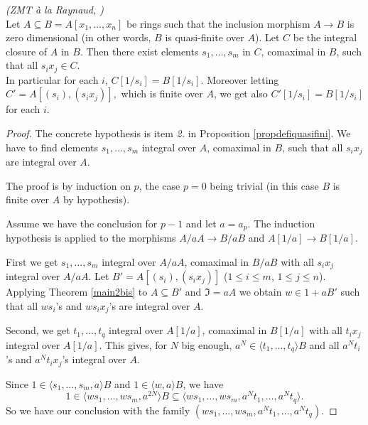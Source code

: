 \documentclass[11pt,a4paper,twoside]{article}
\newcommand{\gothic}{\mathfrak}
\newcommand{\fI}{{\gothic I}}
\newcommand\gen[1]{{\langle #1 \rangle}}
\begin{document}
\begin{theorem}\label{main3} \emph{(ZMT \`a la Raynaud, \cite{Ray})}\\
Let $A\subseteq B = A[x_1,\dots,x_n]$ be rings  
 such that the inclusion morphism $A\to B$ is zero dimensional
 (in other words, $B$ is quasi-finite over $A$).
Let $C$ be the integral closure of $A$ in $B$.
Then  there exist elements $s_1,\dots,s_m$ in $C$, comaximal in $B$, such that
all  $s_ix_j\in C$. \\
In particular for each $i$, $C[1/s_i]=B[1/s_i]$. 
Moreover  letting $C'=A[(s_i),(s_ix_j)],$ which is finite over $A$,
 we get also  $C'[1/s_i]=B[1/s_i]$ for each $i$.
 \end{theorem}
%
\begin{proof}
The concrete hypothesis is item \emph{2.} in Proposition \ref{propdefiquasifini}.
We have to find elements $s_1,\dots,s_m$ integral over $A$, comaximal in $B$,
such that all $s_ix_j$ are integral over $A$.

\noindent 
The proof is by induction on $p$, the case $p=0$ being trivial (in this case $B$
is finite over $A$ by hypothesis). 

\noindent 
Assume we have the conclusion for $p-1$ and let $a=a_p$. The induction hypothesis is applied to the morphisms $A/aA\to B/aB$ and $A[1/a]\to B[1/a]$.

\noindent 
First we get $s_1,\dots,s_m$ integral over $A/aA$, comaximal in $B/aB$
with all $s_ix_j$ integral over $A/aA$. 
Let $B'=A[(s_i),(s_ix_j)]$ ($1\leq i\leq m $, $1\leq j\leq n$).
Applying Theorem  \ref{main2bis} to $A\subseteq B'$ and $\fI=aA$ we obtain $w\in 1+aB'$ such that all $ws_i$'s and $ws_ix_j$'s are integral over $A$.

\noindent 
Second, we get $t_1,\dots,t_q$ integral over $A[1/a]$, comaximal in $B[1/a]$
with all $t_ix_j$ integral over $A[1/a]$. This gives, for $N$ big enough, $a^N\in\gen{t_1,\dots,t_q}B$
and all $a^Nt_i $'s and $a^Nt_ix_j $'s integral over $A$.
  

\noindent Since $1\in\gen{s_1,\dots,s_m,a}B$ and $1\in \gen{w,a}B$, we have
$$
   1\in\gen{ws_1,\dots,ws_m,a^{2N}}B\subseteq
   \gen{ws_1,\dots,ws_m,a^Nt_1,\dots,a^Nt_q} .
$$ 
So we have our conclusion with 
the family $(ws_1,\dots,ws_m,a^Nt_1,\dots,a^Nt_q)$.
\end{proof}
 
	
\end{document}
